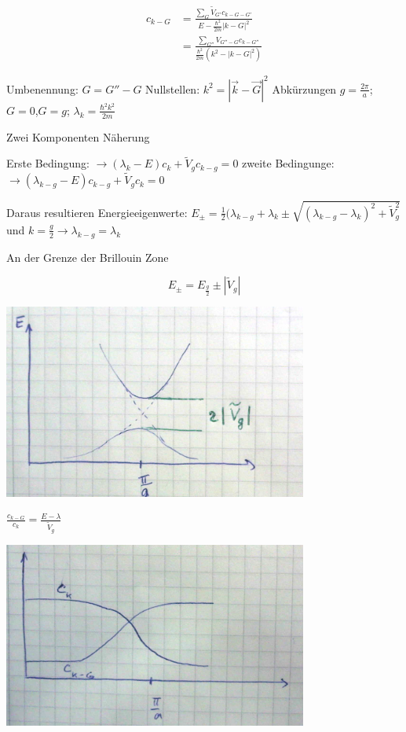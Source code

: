 \begin{align}
c_{k-G} &= \frac{\sum_G \tilde V_{G'}c_{k-G-G'}}{E-\frac{\hbar^2}{2m}|k-G|^2}\\
&= \frac{\sum_{G''}V_{G''-G}c_{k-G''}}{\frac{\hbar^2}{2m}(k^2-|k-G|^2)}
\end{align}

Umbenennung: \(G=G''-G\)
Nullstellen: \(k^2=|\vec k-\vec G|^2\)
Abkürzungen \(g=\frac{2\pi}{a}\); \(G=0\),\(G=g\); \(\lambda_k = \frac{\hbar^2 k^2}{2m}\)


Zwei Komponenten Näherung 

Erste Bedingung: \(\rightarrow (\lambda_k -E)c_k+\tilde V_g c_{k-g} = 0\)
zweite Bedingunge: \(\rightarrow (\lambda_{k-g} -E)c_{k-g}+\tilde V_g c_k = 0\)

Daraus resultieren Energieeigenwerte: \(E_{\pm}=\frac{1}{2}(\lambda_{k-g}+\lambda_k\pm \sqrt{(\lambda_{k-g}-\lambda_k)^2+\tilde V_g^2}\) und \(k=\frac{g}{2}\rightarrow \lambda_{k-g}=\lambda_k\)

An der Grenze der Brillouin Zone

\[ E_{\pm} = E_{\frac{g}{2}}\pm|\tilde V_g| \]

\includegraphics[width=0.75\textwidth]{kap06_37.png}

\(\frac{c_{k-G}}{c_k}=\frac{E-\lambda}{\tilde V_g}\)


\includegraphics[width=0.75\textwidth]{kap06_38.png}




